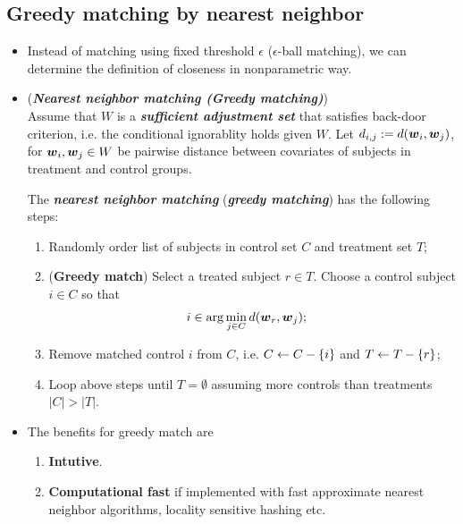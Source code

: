 \documentclass[11pt]{article}
\begin{document}
\subsection{Greedy matching by nearest neighbor}
\begin{itemize}
\item Instead of matching using fixed threshold $\epsilon$ ($\epsilon$-ball matching), we can determine the definition of closeness in nonparametric way.

\item \begin{definition} (\emph{\textbf{Nearest neighbor matching (Greedy matching)}})\\
Assume that $W$ is a \emph{\textbf{sufficient adjustment set}} that satisfies back-door criterion, i.e. the conditional ignorablity holds given $W$. Let $d_{i,j}:= d(\boldsymbol{w}_i, \boldsymbol{w}_{j})$, for $\boldsymbol{w}_i, \boldsymbol{w}_{j}\in W$ be pairwise distance between covariates of subjects in treatment and control groups. 

The \emph{\textbf{nearest neighbor matching}} (\emph{\textbf{greedy matching}}) has the following steps:
\begin{enumerate}
\item Randomly order list of subjects in control set $C$ and treatment set $T$;
\item (\textbf{Greedy match}) Select a treated subject $r \in T$. Choose a control subject $i \in C$ so that 
\begin{align*}
i &\in \arg\min_{j \in C} d(\boldsymbol{w}_r, \boldsymbol{w}_{j});
\end{align*} 

\item Remove matched control $i$ from $C$, i.e. $C \leftarrow C - \left\{i\right\}$ and $T \leftarrow T - \left\{r\right\}$;
\item Loop above steps until $T = \emptyset$ assuming more controls than treatments $|C| > |T|$. 
\end{enumerate}
\end{definition}

\item The benefits for greedy match are
\begin{enumerate}
\item \textbf{Intutive}. 
\item \textbf{Computational fast} if implemented with fast approximate nearest neighbor algorithms, locality sensitive hashing etc.
\end{enumerate}


\end{itemize}
\end{document}
